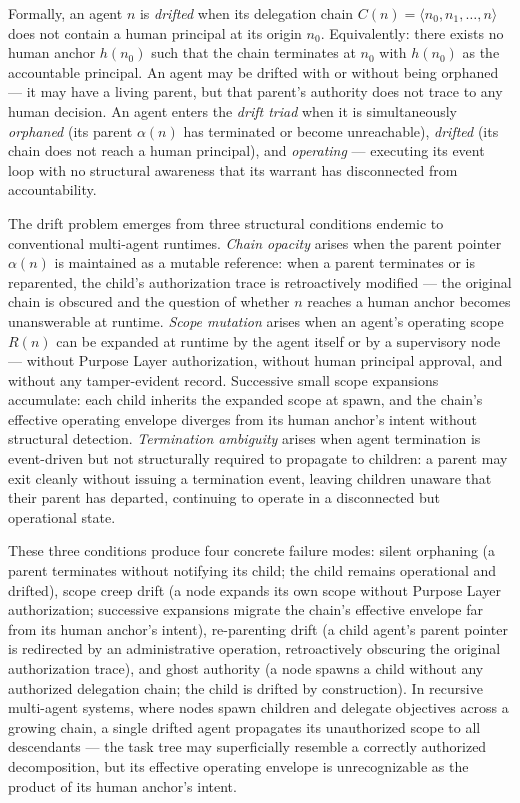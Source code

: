 Formally, an agent $n$ is \emph{drifted} when its delegation chain $C(n) = \langle n_0, n_1, \ldots, n \rangle$ does not contain a human principal at its origin $n_0$. Equivalently: there exists no human anchor $h(n_0)$ such that the chain terminates at $n_0$ with $h(n_0)$ as the accountable principal. An agent may be drifted with or without being orphaned — it may have a living parent, but that parent's authority does not trace to any human decision. An agent enters the \emph{drift triad} when it is simultaneously \emph{orphaned} (its parent $\alpha(n)$ has terminated or become unreachable), \emph{drifted} (its chain does not reach a human principal), and \emph{operating} — executing its event loop with no structural awareness that its warrant has disconnected from accountability.

The drift problem emerges from three structural conditions endemic to conventional multi-agent runtimes. \emph{Chain opacity} arises when the parent pointer $\alpha(n)$ is maintained as a mutable reference: when a parent terminates or is reparented, the child's authorization trace is retroactively modified — the original chain is obscured and the question of whether $n$ reaches a human anchor becomes unanswerable at runtime. \emph{Scope mutation} arises when an agent's operating scope $R(n)$ can be expanded at runtime by the agent itself or by a supervisory node — without Purpose Layer authorization, without human principal approval, and without any tamper-evident record. Successive small scope expansions accumulate: each child inherits the expanded scope at spawn, and the chain's effective operating envelope diverges from its human anchor's intent without structural detection. \emph{Termination ambiguity} arises when agent termination is event-driven but not structurally required to propagate to children: a parent may exit cleanly without issuing a termination event, leaving children unaware that their parent has departed, continuing to operate in a disconnected but operational state.

These three conditions produce four concrete failure modes: silent orphaning (a parent terminates without notifying its child; the child remains operational and drifted), scope creep drift (a node expands its own scope without Purpose Layer authorization; successive expansions migrate the chain's effective envelope far from its human anchor's intent), re-parenting drift (a child agent's parent pointer is redirected by an administrative operation, retroactively obscuring the original authorization trace), and ghost authority (a node spawns a child without any authorized delegation chain; the child is drifted by construction). In recursive multi-agent systems, where nodes spawn children and delegate objectives across a growing chain, a single drifted agent propagates its unauthorized scope to all descendants — the task tree may superficially resemble a correctly authorized decomposition, but its effective operating envelope is unrecognizable as the product of its human anchor's intent.

